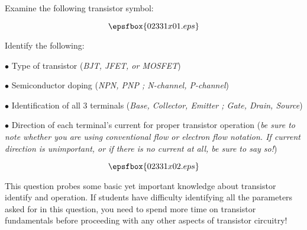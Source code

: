 

Examine the following transistor symbol:

$$\epsfbox{02331x01.eps}$$

\goodbreak

Identify the following:

\medskip
\item{$\bullet$} Type of transistor ({\it BJT, JFET, or MOSFET})
\item{$\bullet$} Semiconductor doping ({\it NPN, PNP ; N-channel, P-channel})
\item{$\bullet$} Identification of all 3 terminals ({\it Base, Collector, Emitter ; Gate, Drain, Source})
\item{$\bullet$} Direction of each terminal's current for proper transistor operation ({\it be sure to note whether you are using conventional flow or electron flow notation.  If current direction is unimportant, or if there is no current at all, be sure to say so!})
\medskip







$$\epsfbox{02331x02.eps}$$







This question probes some basic yet important knowledge about transistor identify and operation.  If students have difficulty identifying all the parameters asked for in this question, you need to spend more time on transistor fundamentals before proceeding with any other aspects of transistor circuitry!





